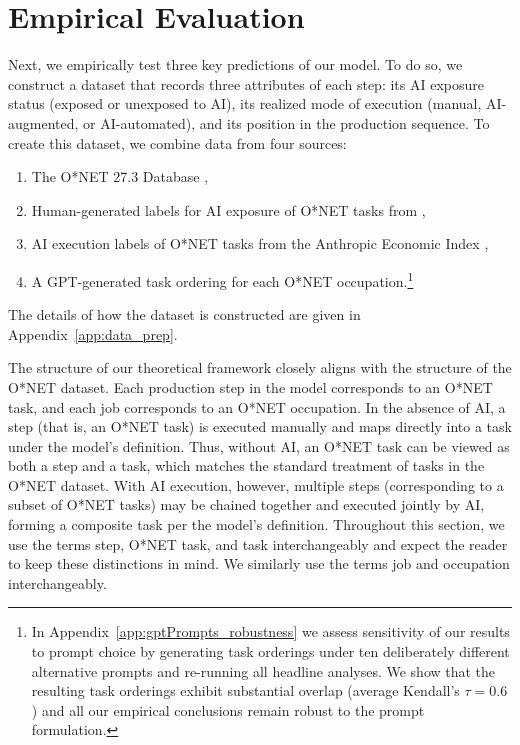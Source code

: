 \section{Empirical Evaluation}
\label{sec:empirics}

Next, we empirically test three key predictions of our model.
To do so, we construct a dataset that records three attributes of each step: its AI exposure status (exposed or unexposed to AI), its realized mode of execution (manual, AI-augmented, or AI-automated), and its position in the production sequence.
To create this dataset, we combine data from four sources: 
\begin{enumerate}
    \item The O*NET 27.3 Database \citep{onet27_3},
    \item Human-generated labels for AI exposure of O*NET tasks from \cite{eloundou2023gpts},
    \item AI execution labels of O*NET tasks from the Anthropic Economic Index \citep{handa2025economictasksperformedai},
    \item A GPT-generated task ordering for each O*NET occupation.\footnote{In Appendix~\ref{app:gptPrompts_robustness} we assess sensitivity of our results to prompt choice by generating task orderings under ten deliberately different alternative prompts and re-running all headline analyses. 
    We show that the resulting task orderings exhibit substantial overlap (average Kendall's $\tau = 0.6$) and all our empirical conclusions remain robust to the prompt formulation.}
\end{enumerate}
The details of how the dataset is constructed are given in Appendix~\ref{app:data_prep}.

The structure of our theoretical framework closely aligns with the structure of the O*NET dataset.
Each production step in the model corresponds to an O*NET task, and each job corresponds to an O*NET occupation.
In the absence of AI, a step (that is, an O*NET task) is executed manually and maps directly into a task under the model's definition.
Thus, without AI, an O*NET task can be viewed as both a step and a task, which matches the standard treatment of tasks in the O*NET dataset.
With AI execution, however, multiple steps (corresponding to a subset of O*NET tasks) may be chained together and executed jointly by AI, forming a composite task per the model's definition.
Throughout this section, we use the terms step, O*NET task, and task interchangeably and expect the reader to keep these distinctions in mind.
We similarly use the terms job and occupation interchangeably.

